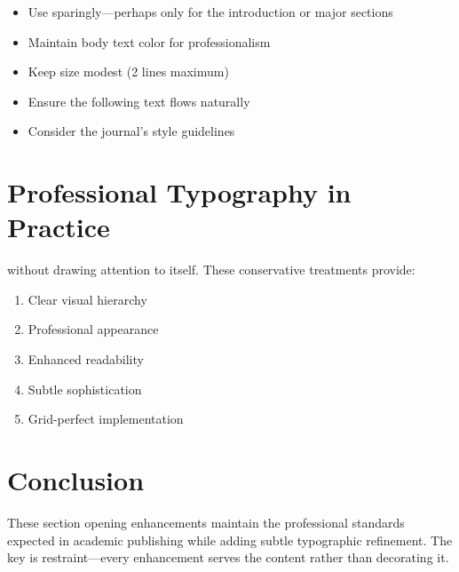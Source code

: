 \documentclass[11pt]{article}
\begin{document}
\begin{itemize}
\item Use sparingly—perhaps only for the introduction or major sections
\item Maintain body text color for professionalism
\item Keep size modest (2 lines maximum)
\item Ensure the following text flows naturally
\item Consider the journal's style guidelines
\end{itemize}

\section{Professional Typography in Practice}

 without drawing attention to itself. These conservative treatments provide:

\begin{enumerate}
\item Clear visual hierarchy
\item Professional appearance
\item Enhanced readability
\item Subtle sophistication
\item Grid-perfect implementation
\end{enumerate}

\lipsum[7]

\majorsectionspace

\section{Conclusion}

These section opening enhancements maintain the professional standards expected in academic publishing while adding subtle typographic refinement. The key is restraint—every enhancement serves the content rather than decorating it.
\end{document}
